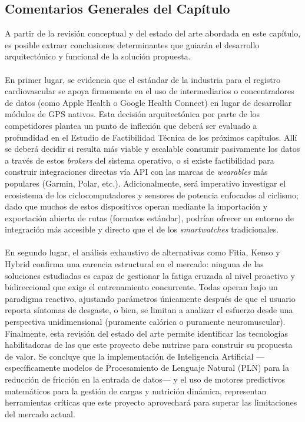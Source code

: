 \documentclass[12pt]{article}
\begin{document}
\subsection{Comentarios Generales del Capítulo}

A partir de la revisión conceptual y del estado del arte abordada en este capítulo, es posible extraer conclusiones determinantes que guiarán el desarrollo arquitectónico y funcional de la solución propuesta.
\\\\
En primer lugar, se evidencia que el estándar de la industria para el registro cardiovascular se apoya firmemente en el uso de intermediarios o concentradores de datos (como Apple Health o Google Health Connect) en lugar de desarrollar módulos de GPS nativos. Esta decisión arquitectónica por parte de los competidores plantea un punto de inflexión que deberá ser evaluado a profundidad en el Estudio de Factibilidad Técnica de los próximos capítulos. Allí se deberá decidir si resulta más viable y escalable consumir pasivamente los datos a través de estos \textit{brokers} del sistema operativo, o si existe factibilidad para construir integraciones directas vía API con las marcas de \textit{wearables} más populares (Garmin, Polar, etc.). Adicionalmente, será imperativo investigar el ecosistema de los ciclocomputadores y sensores de potencia enfocados al ciclismo; dado que muchos de estos dispositivos operan mediante la importación y exportación abierta de rutas (formatos estándar), podrían ofrecer un entorno de integración más accesible y directo que el de los \textit{smartwatches} tradicionales.
\\\\
En segundo lugar, el análisis exhaustivo de alternativas como Fitia, Kenso y Hybrid confirma una carencia estructural en el mercado: ninguna de las soluciones estudiadas es capaz de gestionar la fatiga cruzada al nivel proactivo y bidireccional que exige el entrenamiento concurrente. Todas operan bajo un paradigma reactivo, ajustando parámetros únicamente después de que el usuario reporta síntomas de desgaste, o bien, se limitan a analizar el esfuerzo desde una perspectiva unidimensional (puramente calórica o puramente neuromuscular).
\newpage
Finalmente, esta revisión del estado del arte permite identificar las tecnologías habilitadoras de las que este proyecto debe nutrirse para construir su propuesta de valor. Se concluye que la implementación de Inteligencia Artificial ---específicamente modelos de Procesamiento de Lenguaje Natural (PLN) para la reducción de fricción en la entrada de datos--- y el uso de motores predictivos matemáticos para la gestión de cargas y nutrición dinámica, representan herramientas críticas que este proyecto aprovechará para superar las limitaciones del mercado actual.
\newpage
\end{document}
